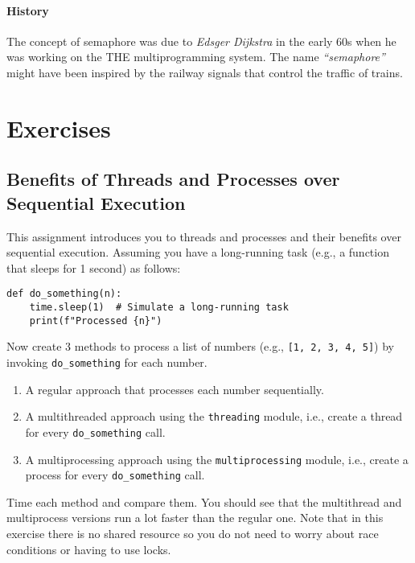 \documentclass[oneside,11pt,dvipsnames]{book}
\newcommand{\code}[1]{\texttt{#1}}
\begin{document}
\paragraph{History} The concept of semaphore was due to \emph{Edsger Dijkstra} in the early 60s when he was working on the THE multiprogramming system. The name \emph{``semaphore''} might have been inspired by the railway signals that control the traffic of trains.





\section{Exercises}
\subsection{Benefits of Threads and Processes over Sequential Execution}\label{ex:threads-and-processes-vs-sequential}

This assignment introduces you to threads and processes and their benefits over sequential execution.  Assuming you have a long-running task (e.g., a function that sleeps for 1 second) as follows: 

\begin{lstlisting}
def do_something(n):
    time.sleep(1)  # Simulate a long-running task
    print(f"Processed {n}")
\end{lstlisting}

Now create 3 methods to process a list of numbers (e.g., \code{[1, 2, 3, 4, 5]}) by invoking \code{do\_something} for each number. 
\begin{enumerate}
    \item A regular approach that processes each number sequentially.
    \item A multithreaded approach using the \code{threading} module, i.e., create a thread for every \code{do\_something} call.
    \item A multiprocessing approach using the \code{multiprocessing} module, i.e., create a process for every \code{do\_something} call.
\end{enumerate}
Time each method and compare them. You should see that the multithread and multiprocess versions run a lot faster than the regular one.
Note that in this exercise there is no shared resource so you do not need to worry about race conditions or having to use locks. 
\end{document}
